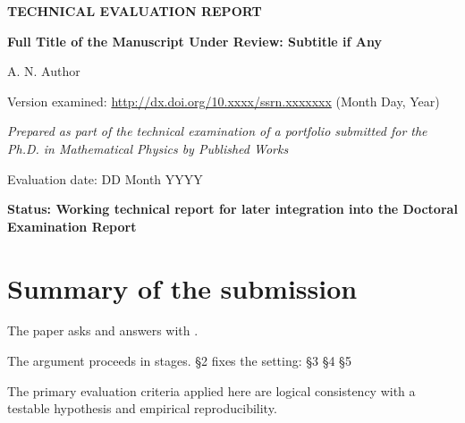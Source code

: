 \documentclass[11pt]{article}
\newcommand{\reportKind}{TECHNICAL EVALUATION REPORT}
\newcommand{\paperTitle}{Full Title of the Manuscript Under Review:
                         Subtitle if Any}
\newcommand{\paperAuthor}{A. N. Author}
\newcommand{\paperVersion}{Version examined: \url{http://dx.doi.org/10.xxxx/ssrn.xxxxxxx}
                           (Month Day, Year)}
\newcommand{\evalDate}{Evaluation date: DD Month YYYY}
\newcommand{\evalContext}{Prepared as part of the technical examination of a
  portfolio submitted for the Ph.D. in Mathematical Physics by Published Works}
\newcommand{\reportStatus}{Working technical report for later integration into
  the Doctoral Examination Report}
\newif\ifdraftnotes     \draftnotesfalse    %
\theoremstyle{definition}
\newcommand{\note}[1]{\ifdraftnotes\textcolor{red}{\small[\,#1\,]}\fi}
\newcommand{\ms}[1]{\S#1}
\begin{document}

\begin{titlepage}
\centering
\vspace*{2cm}
{\LARGE\bfseries \reportKind\par}
\vspace{1.2cm}
{\Large\bfseries \paperTitle\par}
\vspace{0.7cm}
{\large \paperAuthor\par}
\vspace{1.4cm}
{\normalsize \paperVersion\par}
\vspace{1cm}
{\itshape \evalContext\par}
\vfill
{\evalDate\par}
\vspace{0.8cm}
{\bfseries Status: \reportStatus\par}
\end{titlepage}

\tableofcontents
\newpage

\section{Summary of the submission}

The paper asks \note{question} and answers with \note{form of the answer}.

The argument proceeds in \note{n} stages. \ms{2} fixes the setting: \note{\dots}
\ms{3} \note{\dots} \ms{4} \note{\dots} \ms{5} \note{\dots}

The primary evaluation criteria applied here are logical consistency with a
testable hypothesis and empirical reproducibility. \note{State what the paper
claims about its own verifiability, and what was done to test that claim ---
independent re-derivation, exact arithmetic, simulation replication, data
re-analysis, as applicable.}

\end{document}
